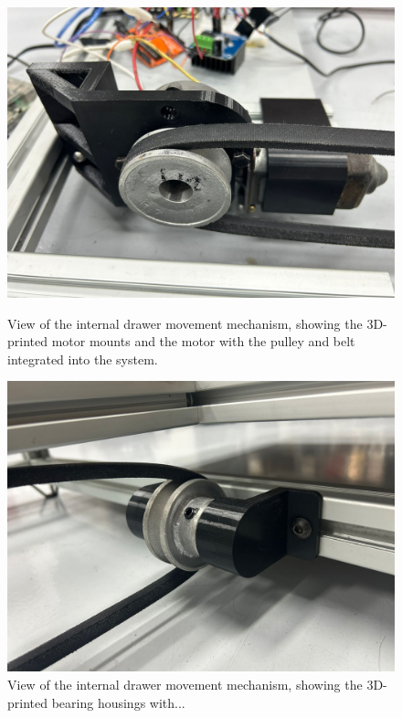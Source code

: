 \begin{figure}[H]
    \centering
    \begin{minipage}{0.49\textwidth}
        \centering
        \includegraphics[width=\textwidth]{MECANISMO/MOTOR_MECANISMO.jpg}
        \caption{View of the internal drawer movement mechanism, showing the 3D-printed motor mounts and the motor with the pulley and belt integrated into the system.}
        \label{fig:motor_mecanismo}
    \end{minipage}%
    \hfill
    \begin{minipage}{0.49\textwidth}
        \centering
        \includegraphics[width=\textwidth]{MECANISMO/MECANISMO_CHUMACERAS.jpg}
        \caption{View of the internal drawer movement mechanism, showing the 3D-printed bearing housings with...}

\end{minipage}
\end{figure}
